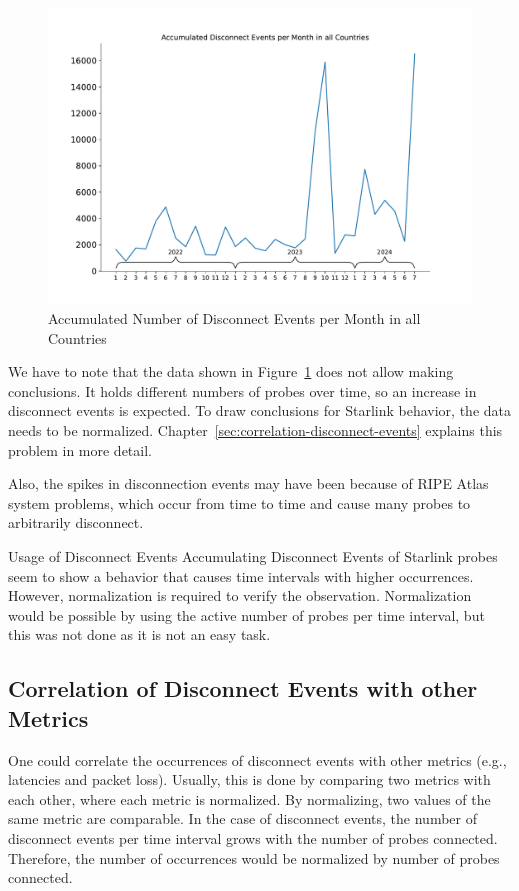 \begin{figure}
	\centering
	\includegraphics[width=.7\linewidth]{./chapters/4-results/disconnect_events/accumulated_disconnect_events_per_month_in_all_countries.pdf}
	\caption{Accumulated Number of Disconnect Events per Month in all
		Countries}
	\label{fig:disconnect-events-absolute-all-countries}
\end{figure}

We have to note that the data shown in
Figure~\ref{fig:disconnect-events-absolute-all-countries} does not allow making
conclusions. It holds different numbers of probes over time, so an increase in
disconnect events is expected. To draw conclusions for Starlink behavior, the
data needs to be normalized. Chapter~\ref{sec:correlation-disconnect-events}
explains this problem in more detail.

Also, the spikes in disconnection events may have been because of RIPE Atlas
system problems, which occur from time to time and cause many probes to
arbitrarily disconnect.

\begin{takeaway}{Usage of Disconnect Events}
	Accumulating Disconnect Events of Starlink probes seem to show a
	behavior that causes time intervals with higher occurrences. However,
	normalization is required to verify the observation. Normalization
	would be possible by using the active number of probes per time
	interval, but this was not done as it is not an easy task.
\end{takeaway}

\subsection*{Correlation of Disconnect Events with other Metrics}
\label{sec:correlation-disconnect-events}

One could correlate the occurrences of disconnect events with other metrics
(e.g., latencies and packet loss). Usually, this is done by comparing two
metrics with each other, where each metric is normalized. By normalizing, two
values of the same metric are comparable. In the case of disconnect events, the
number of disconnect events per time interval grows with the number of probes
connected. Therefore, the number of occurrences would be normalized by number
of probes connected.

